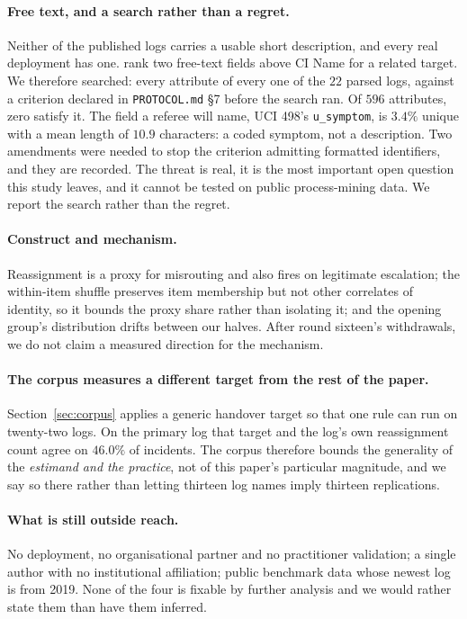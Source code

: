 \documentclass[preprint,12pt]{elsarticle}
\begin{document}
\paragraph{Free text, and a search rather than a regret.}
Neither of the published logs carries a usable short description, and every
real deployment has one. \citet{kapel2026change} rank two free-text fields
above CI Name for a related target. We therefore searched: every attribute of
every one of the $22$ parsed logs, against a criterion declared in
\texttt{PROTOCOL.md} \S7 before the search ran. Of $596$ attributes, zero
satisfy it. The field a referee will name, UCI 498's \texttt{u\_symptom}, is
$3.4\%$ unique with a mean length of $10.9$ characters: a coded symptom, not a
description. Two amendments were needed to stop the criterion admitting
formatted identifiers, and they are recorded. The threat is real, it is the
most important open question this study leaves, and it cannot be tested on
public process-mining data. We report the search rather than the regret.

\paragraph{Construct and mechanism.}
Reassignment is a proxy for misrouting and also fires on legitimate
escalation; the within-item shuffle preserves item membership but not other
correlates of identity, so it bounds the proxy share rather than isolating
it; and the opening group's distribution drifts between our halves. After
round sixteen's withdrawals, we do not claim a measured direction for the
mechanism.

\paragraph{The corpus measures a different target from the rest of the paper.}
Section~\ref{sec:corpus} applies a generic handover target so that one rule
can run on twenty-two logs. On the primary log that target and the log's own
reassignment count agree on $46.0\%$ of incidents. The corpus therefore bounds
the generality of the \emph{estimand and the practice}, not of this paper's
particular magnitude, and we say so there rather than letting thirteen log
names imply thirteen replications.

\paragraph{What is still outside reach.}
No deployment, no organisational partner and no practitioner validation; a
single author with no institutional affiliation; public benchmark data whose
newest log is from 2019. None of the four is fixable by further analysis and
we would rather state them than have them inferred.
\end{document}
